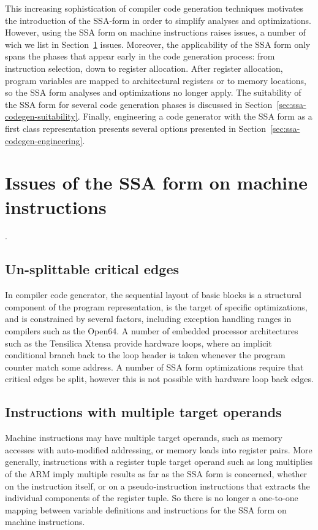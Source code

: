 This increasing sophistication of compiler code generation techniques motivates
the introduction of the SSA-form in order to simplify analyses and
optimizations. However, using the SSA form on machine instructions raises issues,
a number of wich we list in Section~\ref{sec:ssa-codegen-issues} issues.
Moreover, the applicability of the SSA form only spans the phases that appear
early in the code generation process: from instruction selection, down to
register allocation. After register allocation, program variables are mapped to
architectural registers or to memory locations, so the SSA form analyses and
optimizations no longer apply. The suitability of the SSA form for several code
generation phases is discussed in
Section~\ref{sec:ssa-codegen-suitability}. Finally, engineering a code generator
with the SSA form as a first class representation presents several options
presented in Section~\ref{sec:ssa-codegen-engineering}.

\section{Issues of the SSA form on machine instructions}
\label{sec:ssa-codegen-issues}.

\subsection{Un-splittable critical edges}

In compiler code generator, the sequential layout of basic blocks is a
structural component of the program representation, is the target of specific
optimizations, and is constrained by several factors, including exception
handling ranges in compilers such as the Open64. A number of embedded processor
architectures such as the Tensilica Xtensa provide hardware loops, where an
implicit conditional branch back to the loop header is taken whenever the
program counter match some address. A number of SSA form optimizations require
that critical edges be split, however this is not possible with hardware loop
back edges.

\subsection{Instructions with multiple target operands}

Machine instructions may have multiple target operands, such as memory
accesses with auto-modified addressing, or memory loads into register pairs.
More generally, instructions with a register tuple target operand such as long
multiplies of the ARM imply multiple results as far as the SSA form is
concerned, whether on the instruction itself, or on a pseudo-instruction
instructions that extracts the individual components of the register tuple. So
there is no longer a one-to-one mapping between variable definitions and
instructions for the SSA form on machine instructions.


